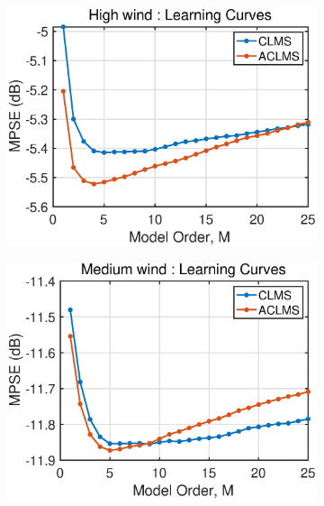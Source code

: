 \begin{figure}[htp]
    \centering
    \hspace{-0.4cm}
    \begin{subfigure}[b]{0.3\textwidth}
     \centering
     \includegraphics[width=1.2\textwidth]{fig/31/31b4.eps}
    \end{subfigure}
    \hspace{0.4cm}
    \begin{subfigure}[b]{0.3\textwidth}
     \centering
     \includegraphics[width=1.2\textwidth]{fig/31/31b5.eps}
    \end{subfigure}  
    \hspace{0.4cm}
    \begin{subfigure}[b]{0.3\textwidth}

\end{subfigure}
\end{figure}
